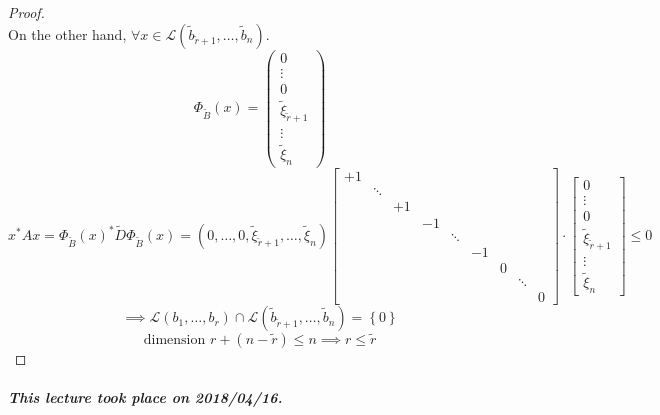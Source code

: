 \documentclass{article}
\newcommand{\set}[1]{\left\{#1\right\}}
\newcommand{\dateref}[1]{\paragraph{\textit{This lecture took place on #1.}}}
\begin{document}
\begin{proof}
\[  \]
  On the other hand, $\forall x \in \mathcal L(\tilde b_{\tilde r + 1}, \dots, \tilde b_n)$.
  \[
    \Phi_{\tilde B}(x) =
      \begin{pmatrix}
        0 \\ \vdots \\ 0 \\
        \tilde \xi_{\tilde r+1} \\
        \vdots \\ \tilde \xi_n
      \end{pmatrix}
  \] \[
    x^* Ax = \Phi_{\tilde B}(x)^* \tilde D \Phi_{\tilde B}(x)
    = (0, \dots, 0, \tilde \xi_{\tilde r + 1}, \dots, \tilde \xi_n)
    \begin{bmatrix}
       +1 &        &       &    &        &    &   &        & \\
          & \ddots &       &    &        &    &   &        & \\
          &        &    +1 &    &        &    &   &        & \\
          &        &       & -1 &        &    &   &        & \\
          &        &       &    & \ddots &    &   &        & \\
          &        &       &    &        & -1 &   &        & \\
          &        &       &    &        &    & 0 &        & \\
          &        &       &    &        &    &   & \ddots & \\
          &        &       &    &        &    &   &        & 0
    \end{bmatrix} \cdot \begin{bmatrix}
      0 \\ \vdots \\ 0 \\ \tilde \xi_{\tilde r+1} \\ \vdots \\ \tilde \xi_n
    \end{bmatrix} \leq 0
  \] \[
    \implies \mathcal L(b_1, \dots, b_r) \cap \mathcal L(\tilde b_{\tilde r+1}, \dots, \tilde b_n) = \set{0}
  \] \[
    \text{dimension } r + (n - \tilde r) \leq n \implies r \leq \tilde r
  \]
\end{proof}

\dateref{2018/04/16}
\end{document}
